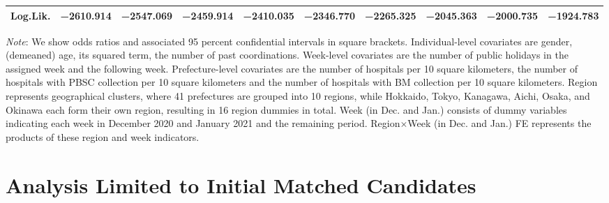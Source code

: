 \documentclass[12pt, a4paper]{article}
\begin{document}
\begin{landscape}
\begin{table}[H]
\begin{threeparttable}
\begin{tabular}[t]{lccccccccc}
Log.Lik. & \num{-2610.914} & \num{-2547.069} & \num{-2459.914} & \num{-2410.035} & \num{-2346.770} & \num{-2265.325} & \num{-2045.363} & \num{-2000.735} & \num{-1924.783}\\
\bottomrule
\end{tabular}
\begin{tablenotes}
\item \emph{Note}: We show odds ratios and associated 95 percent confidential intervals in square brackets. Individual-level covariates are gender, (demeaned) age, its squared term, the number of past coordinations. Week-level covariates are the number of public holidays in the assigned week and the following week. Prefecture-level covariates are the number of hospitals per 10 square kilometers, the number of hospitals with PBSC collection per 10 square kilometers and the number of hospitals with BM collection per 10 square kilometers. Region represents geographical clusters, where 41 prefectures are grouped into 10 regions, while Hokkaido, Tokyo, Kanagawa, Aichi, Osaka, and Okinawa each form their own region, resulting in 16 region dummies in total. Week (in Dec. and Jan.) consists of dummy variables indicating each week in December 2020 and January 2021 and the remaining period. Region$\times$Week (in Dec. and Jan.) FE represents the products of these region and week indicators.
\end{tablenotes}
\end{threeparttable}
\end{table}
\end{landscape}

\clearpage

\hypertarget{analysis-limited-to-initial-matched-candidates}{%
\section{Analysis Limited to Initial Matched Candidates}\label{analysis-limited-to-initial-matched-candidates}}
\end{document}
